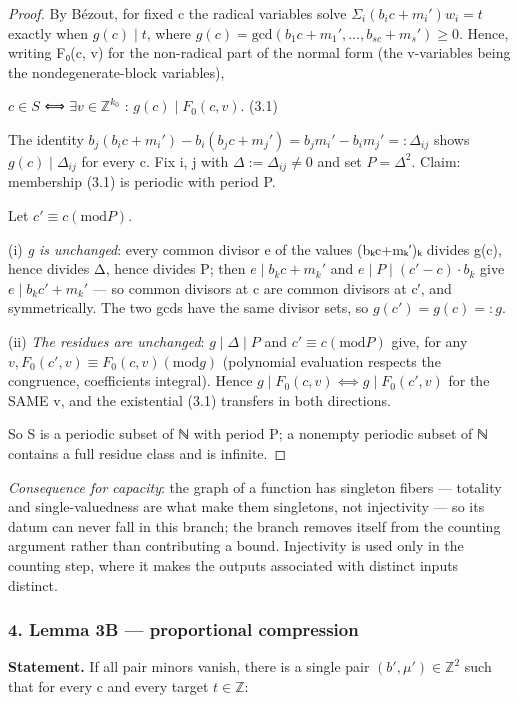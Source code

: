 \begin{proof}
By Bézout, for fixed c the radical variables solve $Σ_{i} (b_{i}c+m_{i}′)w_{i} = t$ exactly when $g(c) ∣ t$, where $g(c) = \mathrm{gcd}(b_{1}c+m_{1}′, …, b_{sc}+m_{s}′) ≥ 0$. Hence, writing F₀(c, v) for the non-radical part of the normal form (the v-variables being the nondegenerate-block variables),

$c ∈ S$  ⟺  $∃ v ∈ ℤ^{k_{0}}$ : $g(c) ∣ F_{0}(c, v)$.                    (3.1)

The identity  $b_{j}(b_{i}c + m_{i}′) − b_{i}(b_{j}c + m_{j}′) = b_{j}m_{i}′ − b_{i}m_{j}′ =: Δ_{ij}$ shows $g(c) ∣ Δ_{ij}$ for every c. Fix i, j with $Δ := Δ_{ij} ≠ 0$ and set $P = Δ^{2}$. Claim: membership (3.1) is periodic with period P.

Let $c′ ≡ c (\mathrm{mod} P)$.

(i) \emph{g is unchanged}: every common divisor e of the values (bₖc+mₖ′)ₖ divides g(c), hence divides Δ, hence divides P; then $e ∣ b_{k}c+m_{k}′$ and $e ∣ P ∣ (c′−c)·b_{k}$ give $e ∣ b_{k}c′+m_{k}′$ — so common divisors at c are common divisors at c′, and symmetrically. The two gcds have the same divisor sets, so $g(c′) = g(c) =: g$.

(ii) \emph{The residues are unchanged}: $g ∣ Δ ∣ P$ and $c′ ≡ c (\mathrm{mod} P)$ give, for any $v, F_{0}(c′, v) ≡ F_{0}(c, v) (\mathrm{mod} g)$ (polynomial evaluation respects the congruence, coefficients integral). Hence $g ∣ F_{0}(c, v) ⟺ g ∣ F_{0}(c′, v)$ for the SAME v, and the existential (3.1) transfers in both directions.

So S is a periodic subset of ℕ with period P; a nonempty periodic subset of ℕ contains a full residue class and is infinite.

\end{proof}
\emph{Consequence for capacity}: the graph of a function has singleton fibers — totality and single-valuedness are what make them singletons, not injectivity — so its datum can never fall in this branch; the branch removes itself from the counting argument rather than contributing a bound. Injectivity is used only in the counting step, where it makes the outputs associated with distinct inputs distinct.

\subsubsection*{4. Lemma 3B — proportional compression}
\textbf{Statement.} If all pair minors vanish, there is a single pair $(b′, μ′) ∈ ℤ^{2}$ such that for every c and every target $t ∈ ℤ$:

